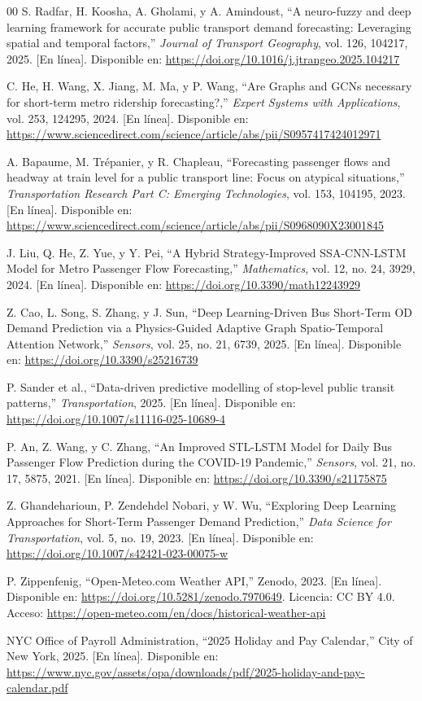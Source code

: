 \documentclass[preprint,12pt]{elsarticle}
\begin{document}
\begin{thebibliography}{00}
S. Radfar, H. Koosha, A. Gholami, y A. Amindoust, ``A neuro-fuzzy and deep learning framework for accurate public transport demand forecasting: Leveraging spatial and temporal factors,'' \textit{Journal of Transport Geography}, vol. 126, 104217, 2025. [En línea]. Disponible en: \url{https://doi.org/10.1016/j.jtrangeo.2025.104217}

C. He, H. Wang, X. Jiang, M. Ma, y P. Wang, ``Are Graphs and GCNs necessary for short-term metro ridership forecasting?,'' \textit{Expert Systems with Applications}, vol. 253, 124295, 2024. [En línea]. Disponible en: \url{https://www.sciencedirect.com/science/article/abs/pii/S0957417424012971}

A. Bapaume, M. Trépanier, y R. Chapleau, ``Forecasting passenger flows and headway at train level for a public transport line: Focus on atypical situations,'' \textit{Transportation Research Part C: Emerging Technologies}, vol. 153, 104195, 2023. [En línea]. Disponible en: \url{https://www.sciencedirect.com/science/article/abs/pii/S0968090X23001845}

J. Liu, Q. He, Z. Yue, y Y. Pei, ``A Hybrid Strategy-Improved SSA-CNN-LSTM Model for Metro Passenger Flow Forecasting,'' \textit{Mathematics}, vol. 12, no. 24, 3929, 2024. [En línea]. Disponible en: \url{https://doi.org/10.3390/math12243929}

Z. Cao, L. Song, S. Zhang, y J. Sun, ``Deep Learning-Driven Bus Short-Term OD Demand Prediction via a Physics-Guided Adaptive Graph Spatio-Temporal Attention Network,'' \textit{Sensors}, vol. 25, no. 21, 6739, 2025. [En línea]. Disponible en: \url{https://doi.org/10.3390/s25216739}

P. Sander et al., ``Data-driven predictive modelling of stop-level public transit patterns,'' \textit{Transportation}, 2025. [En línea]. Disponible en: \url{https://doi.org/10.1007/s11116-025-10689-4}

P. An, Z. Wang, y C. Zhang, ``An Improved STL-LSTM Model for Daily Bus Passenger Flow Prediction during the COVID-19 Pandemic,'' \textit{Sensors}, vol. 21, no. 17, 5875, 2021. [En línea]. Disponible en: \url{https://doi.org/10.3390/s21175875}

Z. Ghandeharioun, P. Zendehdel Nobari, y W. Wu, ``Exploring Deep Learning Approaches for Short-Term Passenger Demand Prediction,'' \textit{Data Science for Transportation}, vol. 5, no. 19, 2023. [En línea]. Disponible en: \url{https://doi.org/10.1007/s42421-023-00075-w}

P. Zippenfenig, ``Open-Meteo.com Weather API,'' Zenodo, 2023. [En línea]. Disponible en: \url{https://doi.org/10.5281/zenodo.7970649}. Licencia: CC BY 4.0. Acceso: \url{https://open-meteo.com/en/docs/historical-weather-api}

NYC Office of Payroll Administration, ``2025 Holiday and Pay Calendar,'' City of New York, 2025. [En línea]. Disponible en: \url{https://www.nyc.gov/assets/opa/downloads/pdf/2025-holiday-and-pay-calendar.pdf}

\end{thebibliography}
\end{document}
